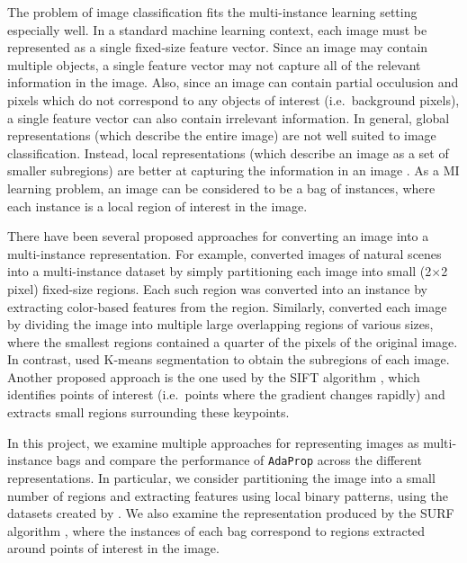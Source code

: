 \documentclass[a4paper,12pt]{report} %
\newcommand{\AdaProp}{\texttt{AdaProp}\xspace}
\begin{document}
The problem of image classification fits the multi-instance learning setting especially well. 
In a standard machine learning context, each image must be represented as a single
    fixed-size feature vector.
Since an image may contain multiple objects,
    a single feature vector may not capture all 
    of the relevant information in the image.
Also, since an image can contain partial occulusion and pixels 
    which do not correspond to any objects of interest (i.e.\ background pixels),
    a single feature vector can also contain irrelevant information.
In general, global representations (which describe the entire image) 
    are not well suited to image classification. Instead, 
    local representations (which describe an image as a set of smaller subregions)
    are better at capturing the information in an image \cite{visObjRecog}.
As a MI learning problem, 
    an image can be considered to be a bag of instances, 
    where each instance is a local region of interest in the image.

There have been several proposed approaches for converting an image into 
    a multi-instance representation.
For example,  converted images of natural scenes 
    into a multi-instance dataset by simply partitioning each image
    into small (2$\times$2 pixel) fixed-size regions.
Each such region was converted into an instance by extracting color-based
    features from the region.
Similarly,  converted each image by dividing the image into 
    multiple large overlapping regions of various sizes, 
    where the smallest regions contained a quarter of the pixels of the original image.
In contrast,  used K-means segmentation to obtain 
    the subregions of each image.
Another proposed approach is the one used by the SIFT algorithm \cite{SIFT},
    which identifies points of interest (i.e.\ points where the gradient changes rapidly)
    and extracts small regions surrounding these keypoints.

In this project, we examine multiple approaches for representing images as 
    multi-instance bags and compare the performance of \AdaProp
    across the different representations.
In particular, we consider partitioning the image into a small number 
    of regions and extracting features using local binary patterns, 
    using the datasets created by .
We also examine the representation produced by the SURF algorithm \cite{SURF}, 
    where the instances of each bag correspond to regions extracted around 
    points of interest in the image.
\end{document}
